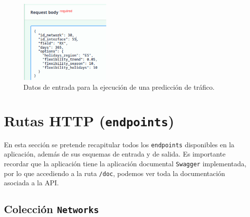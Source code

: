 \documentclass[a4paper, oneside, 12pt]{book}
\begin{document}
	\begin{figure}[h!]
		\begin{center}
			\includegraphics[width=0.4\textwidth]{img/prophet_schema.png}
			\caption{Datos de entrada para la ejecución de una predicción de tráfico.}
			\label{img: prophet schema}
		\end{center}
	\end{figure}

	\pagebreak
	
	\section{Rutas HTTP (\texttt{endpoints})}
	
	\noindent En esta sección se pretende recapitular todos los \texttt{endpoints} disponibles en la aplicación, además de sus esquemas de entrada y de salida. Es importante recordar que la aplicación tiene la aplicación documental \texttt{Swagger} implementada, por lo que accediendo a la ruta \texttt{/doc}, podemos ver toda la documentación asociada a la API.
	
	\subsection{Colección \texttt{Networks}}
	
\end{document}
